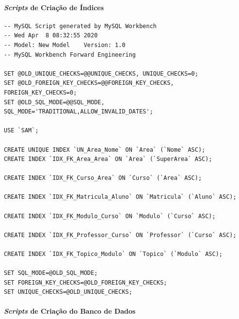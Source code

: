 \documentclass{article}
\begin{document}
\paragraph{\textit{Scripts} de Cria\c{c}\~ao de \'Indices}

%
%
\begin{verbatim}
-- MySQL Script generated by MySQL Workbench
-- Wed Apr  8 08:32:55 2020
-- Model: New Model    Version: 1.0
-- MySQL Workbench Forward Engineering

SET @OLD_UNIQUE_CHECKS=@@UNIQUE_CHECKS, UNIQUE_CHECKS=0;
SET @OLD_FOREIGN_KEY_CHECKS=@@FOREIGN_KEY_CHECKS, FOREIGN_KEY_CHECKS=0;
SET @OLD_SQL_MODE=@@SQL_MODE, SQL_MODE='TRADITIONAL,ALLOW_INVALID_DATES';

USE `SAM`;

CREATE UNIQUE INDEX `UN_Area_Nome` ON `Area` (`Nome` ASC);
CREATE INDEX `IDX_FK_Area_Area` ON `Area` (`SuperArea` ASC);

CREATE INDEX `IDX_FK_Curso_Area` ON `Curso` (`Area` ASC);

CREATE INDEX `IDX_FK_Matricula_Aluno` ON `Matricula` (`Aluno` ASC);

CREATE INDEX `IDX_FK_Modulo_Curso` ON `Modulo` (`Curso` ASC);

CREATE INDEX `IDX_FK_Professor_Curso` ON `Professor` (`Curso` ASC);

CREATE INDEX `IDX_FK_Topico_Modulo` ON `Topico` (`Modulo` ASC);

SET SQL_MODE=@OLD_SQL_MODE;
SET FOREIGN_KEY_CHECKS=@OLD_FOREIGN_KEY_CHECKS;
SET UNIQUE_CHECKS=@OLD_UNIQUE_CHECKS;

\end{verbatim}

\paragraph{\textit{Scripts} de Cria\c{c}\~ao do Banco de Dados}
\end{document}
